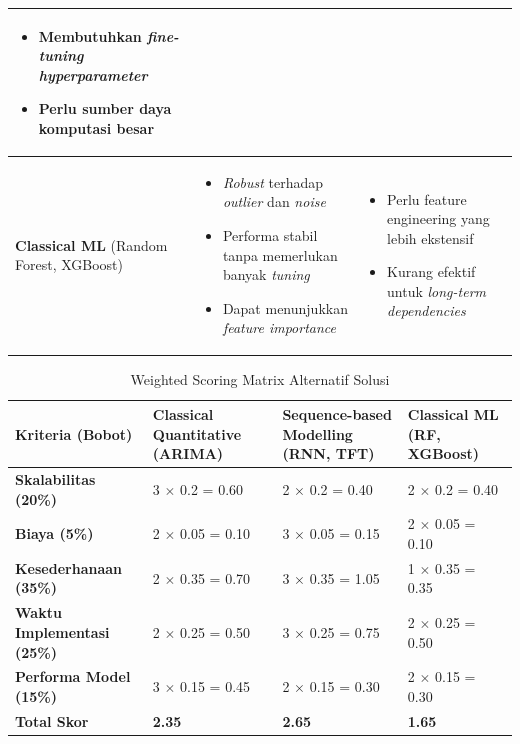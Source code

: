\begin{table}[H]
\begin{tabular}{|p{4cm}|p{5cm}|p{5cm}|}
\begin{itemize}
    \item Membutuhkan \textit{fine-tuning hyperparameter}
    \item Perlu sumber daya komputasi besar
\end{itemize} \\
\hline
\textbf{Classical ML} \newline (Random Forest, XGBoost) & 
\begin{itemize}
    \item \textit{Robust} terhadap \textit{outlier} dan \textit{noise}
    \item Performa stabil tanpa memerlukan banyak \textit{tuning}
    \item Dapat menunjukkan \textit{feature importance}
\end{itemize} & 
\begin{itemize}
    \item Perlu feature engineering yang lebih ekstensif
    \item Kurang efektif untuk \textit{long-term dependencies}
\end{itemize} \\
\hline
\end{tabular}
\end{table}

\begin{table}[H]
\caption{Weighted Scoring Matrix Alternatif Solusi}
\label{table:weighted_matrix}
\begin{tabular}{|p{4cm}|p{3cm}|p{3cm}|p{3cm}|}
\hline
\textbf{Kriteria (Bobot)} & \textbf{Classical Quantitative (ARIMA)} & \textbf{Sequence-based Modelling (RNN, TFT)} & \textbf{Classical ML (RF, XGBoost)} \\ \hline
\textbf{Skalabilitas (20\%)} & 3 $\times$ 0.2 = 0.60 & 2 $\times$ 0.2 = 0.40 & 2 $\times$ 0.2 = 0.40 \\ \hline
\textbf{Biaya (5\%)} & 2 $\times$ 0.05 = 0.10 & 3 $\times$ 0.05 = 0.15 & 2 $\times$ 0.05 = 0.10 \\ \hline
\textbf{Kesederhanaan (35\%)} & 2 $\times$ 0.35 = 0.70 & 3 $\times$ 0.35 = 1.05 & 1 $\times$ 0.35 = 0.35 \\ \hline
\textbf{Waktu Implementasi (25\%)} & 2 $\times$ 0.25 = 0.50 & 3 $\times$ 0.25 = 0.75 & 2 $\times$ 0.25 = 0.50 \\ \hline
\textbf{Performa Model (15\%)} & 3 $\times$ 0.15 = 0.45 & 2 $\times$ 0.15 = 0.30 & 2 $\times$ 0.15 = 0.30 \\ \hline
\textbf{Total Skor} & \textbf{2.35} & \textbf{2.65} & \textbf{1.65} \\ \hline
\end{tabular}
\end{table}

